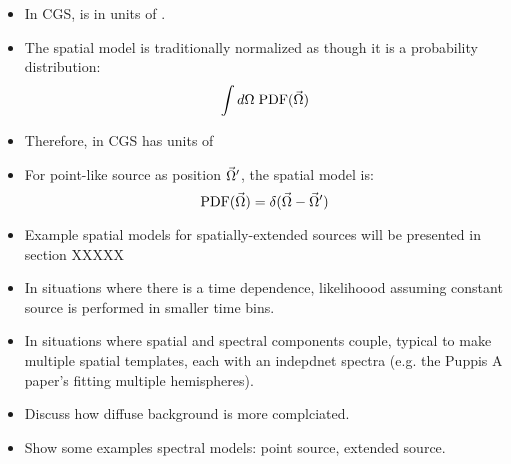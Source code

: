 \begin{itemize}

\item In \ac{CGS}, \dnde is in units of \prefunits.

\item The spatial model is traditionally normalized as though it is a probability
  distribution:
  \begin{equation}
    \int d\Omega \; \text{PDF}(\vec\Omega)
  \end{equation}
\item Therefore, in \ac{CGS} \pdf has units of \pdfunits

\item For point-like source as position $\vec\Omega'$, the spatial model is:
  \begin{equation}
    \text{PDF}(\vec\Omega) = \delta(\vec\Omega - \vec\Omega')
  \end{equation}
\item Example spatial models for spatially-extended sources will be presented
  in section XXXXX


\item In situations where there is a time dependence, likelihoood assuming constant
  source is performed in smaller time bins.
\item In situations where spatial and spectral components couple, typical to make
  multiple spatial templates, each with an indepdnet spectra (e.g. the Puppis A paper's
  fitting multiple hemispheres).
\item Discuss how diffuse background is more complciated.
\item Show some examples spectral models: point source, extended source.
\end{itemize}
